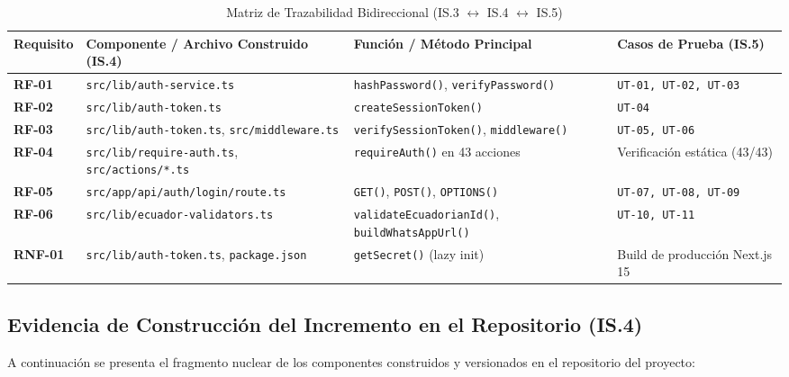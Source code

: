 \documentclass[11pt,a4paper]{article}
\begin{document}
\begin{table}[h!]
\centering
\caption{Matriz de Trazabilidad Bidireccional (IS.3 $\leftrightarrow$ IS.4 $\leftrightarrow$ IS.5)}
\label{tab:trazabilidad}
\renewcommand{\arraystretch}{1.2}
\begin{tabular}{@{}p{1.6cm}p{5.8cm}p{5.0cm}p{3.0cm}@{}}
\toprule
\rowcolor{tableHeader}
\textbf{Requisito} & \textbf{Componente / Archivo Construido (IS.4)} & \textbf{Función / Método Principal} & \textbf{Casos de Prueba (IS.5)} \\
\midrule
\textbf{RF-01} & \texttt{src/lib/auth-service.ts} & \texttt{hashPassword()}, \texttt{verifyPassword()} & \texttt{UT-01, UT-02, UT-03} \\
\textbf{RF-02} & \texttt{src/lib/auth-token.ts} & \texttt{createSessionToken()} & \texttt{UT-04} \\
\textbf{RF-03} & \texttt{src/lib/auth-token.ts}, \texttt{src/middleware.ts} & \texttt{verifySessionToken()}, \texttt{middleware()} & \texttt{UT-05, UT-06} \\
\textbf{RF-04} & \texttt{src/lib/require-auth.ts}, \texttt{src/actions/*.ts} & \texttt{requireAuth()} en 43 acciones & Verificación estática (43/43) \\
\textbf{RF-05} & \texttt{src/app/api/auth/login/route.ts} & \texttt{GET()}, \texttt{POST()}, \texttt{OPTIONS()} & \texttt{UT-07, UT-08, UT-09} \\
\textbf{RF-06} & \texttt{src/lib/ecuador-validators.ts} & \texttt{validateEcuadorianId()}, \texttt{buildWhatsAppUrl()} & \texttt{UT-10, UT-11} \\
\textbf{RNF-01} & \texttt{src/lib/auth-token.ts}, \texttt{package.json} & \texttt{getSecret()} (lazy init) & Build de producción Next.js 15 \\
\bottomrule
\end{tabular}
\end{table}

\subsection{Evidencia de Construcción del Incremento en el Repositorio (IS.4)}
A continuación se presenta el fragmento nuclear de los componentes construidos y versionados en el repositorio del proyecto:
\end{document}
